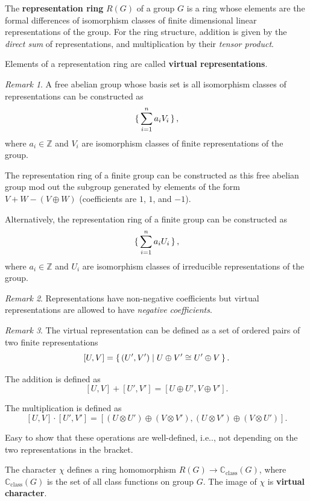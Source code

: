 \documentclass[12pt, letterpaper]{article}
\makeatletter
\newcommand{\inte}{\mathbb{Z}}
\newcommand{\co}{\mathbb{C}}
\newcommand{\class}{\operatorname{class}}
\newcommand\ie{i.e\@ifnextchar.{}{.\@}}
\newcommand{\ec}[1]{\left[{#1}\right]}
\theoremstyle{definition}
\theoremstyle{remark}
\newtheorem*{rem*}{Remark}
\theoremstyle{definition}
\theoremstyle{plain}
\numberwithin{equation}{section}
\makeatother
\begin{document}
	\begin{def*}
		The \textbf{representation ring} $R(G)$ of a group $G$ is a ring 
		whose elements are the formal differences of isomorphism classes of finite dimensional linear representations of the group.
		For the ring structure, addition is given by the \textit{direct sum} of representations, and multiplication by their \textit{tensor product}.
	\end{def*}
	\begin{def*}
		Elements of a representation ring are called \textbf{virtual representations}.
	\end{def*}
	\begin{rem*}
		A free abelian group
		whose basis set is all isomorphism classes of representations can be constructed as
		\[\set{\sum_{i=1}^{n}a_iV_i}, \]
		where $a_i\in \inte$ and $V_i$ are isomorphism classes of finite representations of the group.
		
		The representation ring of a finite group can be constructed as this free abelian group mod out the subgroup
		generated by elements of the form $V + W - (V \oplus W)$ (coefficients are $1$, $1$, and $-1$).
		
		Alternatively, the representation ring of a finite group can be constructed as
		\[\set{\sum_{i=1}^{n}a_iU_i},\]
		where $a_i\in \inte$ and $U_i$ are isomorphism classes of irreducible representations of the group.
	\end{rem*}
	\begin{rem*}
		Representations have non-negative coefficients but virtual representations are allowed to have \textit{negative coefficients}.
	\end{rem*}
	\begin{rem*}
		The virtual representation can be defined as a set of ordered pairs of two finite representations
		\[\ec{U,V}=\set{(U',V')|U\oplus V'\cong U'\oplus V}.\]

		The addition is defined as
		\[\ec{U,V}+\ec{U',V'} = \ec{U\oplus U',V\oplus V'} .\]
		
		The multiplication is defined as
		\[\ec{U,V}\cdot \ec{U',V'} = \ec{(U\otimes U')\oplus (V\otimes V'),(U\otimes V')\oplus (V\otimes U')}. \]
		
		Easy to show that these operations are well-defined, \ie, not depending on the two representations in the bracket.
	\end{rem*}
	\begin{def*}
		The character $\chi$ defines a ring homomorphism $R(G)\to\co_{\class}(G)$,
		where $\co_{\class}(G)$ is the set of all class functions on group $G$.
		The image of $\chi$ is \textbf{virtual character}.
	\end{def*}
\end{document}
